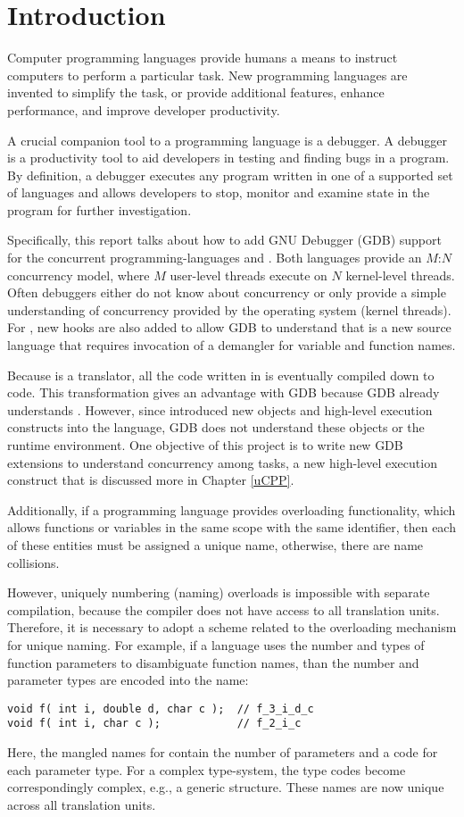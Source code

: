 \chapter{Introduction} \label{introduction}
Computer programming languages provide humans a means to instruct computers to
perform a particular task. New programming languages are
invented to simplify the task, or provide additional features, enhance
performance, and improve developer productivity.

A crucial companion tool to a programming language is a debugger. A debugger is a productivity tool to aid developers in testing
and finding bugs in a program. By definition, a debugger executes
any program written in one of a supported set of languages and allows developers
to stop, monitor and examine state in the program for further investigation.

Specifically, this report talks about how to add GNU Debugger (GDB) support for the
concurrent programming-languages \uCPPS and \CFA.
Both languages provide an $M$:$N$ concurrency model, where $M$ user-level threads
execute on $N$ kernel-level threads.
Often debuggers either do not know about concurrency or only provide a simple
understanding of concurrency provided by the operating system (kernel threads).
For \CFA, new hooks are also added to allow GDB to understand that
\CFAS is a new source language that requires invocation of a demangler for
variable and function names.

Because \uCPPS is a translator, all the code written in \uCPPS is eventually
compiled down to \CCS code. This transformation gives \uCPPS an advantage with
GDB because GDB already understands \CC. However, since \uCPPS introduced new objects
and high-level execution constructs into the language, GDB does not understand
these objects or the runtime environment. One objective of this
project is to write new GDB extensions to understand concurrency among tasks, a new high-level execution construct that is discussed more in Chapter \ref{uCPP}.

Additionally, if a programming language provides overloading functionality,
which allows functions or variables in the same scope with the
same identifier, then each of these entities must be assigned a unique name, otherwise,
there are name collisions.

However, uniquely numbering (naming) overloads is impossible with separate
compilation, because the compiler does not have access to all translation
units. Therefore, it is necessary to adopt a scheme related to the overloading
mechanism for unique naming. For example, if a language uses the number and
types of function parameters to disambiguate function names, than the number
and parameter types are encoded into the name:
\begin{lstlisting}[basicstyle=\normalfont\tt]
void f( int i, double d, char c );  // f_3_i_d_c
void f( int i, char c );            // f_2_i_c
\end{lstlisting}
Here, the mangled names for \lstinline@f@ contain the number of parameters and a code for
each parameter type. For a complex type-system, the type codes become
correspondingly complex, e.g., a generic structure. These names are now unique
across all translation units.

